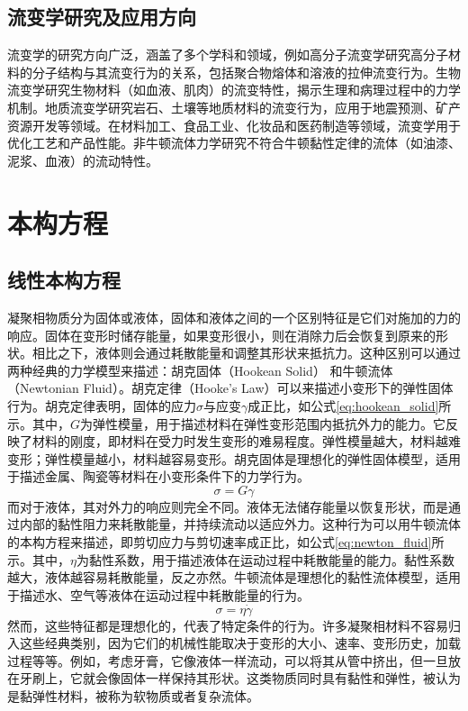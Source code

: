 \subsection{流变学研究及应用方向}
流变学的研究方向广泛，涵盖了多个学科和领域，例如高分子流变学研究高分子材料的分子结构与其流变行为的关系，包括聚合物熔体和溶液的拉伸流变行为\cite{lingComparisonReviewClassical2023}。生物流变学研究生物材料（如血液、肌肉）的流变特性，揭示生理和病理过程中的力学机制\cite{martin2023rheology,jeon2023review}。地质流变学研究岩石、土壤等地质材料的流变行为，应用于地震预测、矿产资源开发等领域\cite{campbellNewtonianPowerLaw2018}。在材料加工\cite{banerjeeRoleRheologyMorphology2023}、食品工业\cite{schreuders2022non}、化妆品和医药制造等领域\cite{kim2024role,murch2024non}，流变学用于优化工艺和产品性能\cite{zhangModificationTechnologiesConstitutive2024}。非牛顿流体力学研究不符合牛顿黏性定律的流体（如油漆、泥浆、血液）的流动特性\cite{sunReviewConstitutiveModels2024,wang2023non,lowe2019rheology}。

\section{本构方程}
\subsection{线性本构方程}
凝聚相物质分为固体或液体，固体和液体之间的一个区别特征是它们对施加的力的响应。固体在变形时储存能量，如果变形很小，则在消除力后会恢复到原来的形状。相比之下，液体则会通过耗散能量和调整其形状来抵抗力\cite{ricarteTutorialReviewLinear2024,yaoInelasticFluidModels2024}。这种区别可以通过两种经典的力学模型来描述：胡克固体（Hookean Solid） 和牛顿流体（Newtonian Fluid）。胡克定律（Hooke's Law）可以来描述小变形下的弹性固体行为。胡克定律表明，固体的应力$\sigma$与应变$\gamma$成正比，如公式\eqref{eq:hookean_solid}所示。其中，$G$为弹性模量，用于描述材料在弹性变形范围内抵抗外力的能力。它反映了材料的刚度，即材料在受力时发生变形的难易程度。弹性模量越大，材料越难变形；弹性模量越小，材料越容易变形。胡克固体是理想化的弹性固体模型，适用于描述金属、陶瓷等材料在小变形条件下的力学行为\cite{sunReviewConstitutiveModels2024}。
\begin{equation}
  \sigma = G \gamma  \label{eq:hookean_solid}
\end{equation}
而对于液体，其对外力的响应则完全不同。液体无法储存能量以恢复形状，而是通过内部的黏性阻力来耗散能量，并持续流动以适应外力。这种行为可以用牛顿流体的本构方程来描述，即剪切应力与剪切速率成正比，如公式\eqref{eq:newton_fluid}所示。其中，$\eta$为黏性系数，用于描述液体在运动过程中耗散能量的能力。黏性系数越大，液体越容易耗散能量，反之亦然。牛顿流体是理想化的黏性流体模型，适用于描述水、空气等液体在运动过程中耗散能量的行为\cite{ricarteTutorialReviewLinear2024}。
\begin{equation}
  \sigma = \eta \dot{\gamma}  \label{eq:newton_fluid}
\end{equation}
然而，这些特征都是理想化的，代表了特定条件的行为。许多凝聚相材料不容易归入这些经典类别，因为它们的机械性能取决于变形的大小、速率、变形历史，加载过程等等。例如，考虑牙膏，它像液体一样流动，可以将其从管中挤出，但一旦放在牙刷上，它就会像固体一样保持其形状。这类物质同时具有黏性和弹性，被认为是黏弹性材料，被称为软物质或者复杂流体\cite{songNonMaxwellianViscoelasticStress2023}。


